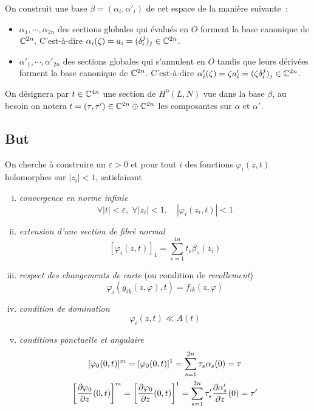 \documentclass[a4paper,10pt,draft,makeidx,twocolumn]{amsart}
\begin{document}
On construit une base $\beta = (\alpha_i, \alpha'_i)$ de cet espace de la manière suivante~:
\begin{itemize}
\item $\alpha_1, \cdots, \alpha_{2n}$ des sections globales qui évalués en $O$ forment la base canonique de $\mathbb{C}^{2n}$.
C'est-à-dire $\alpha_i(\zeta) = a_i = (\delta_i^j)_j \in \mathbb{C}^{2n}$. 
\item $\alpha'_1, \cdots, \alpha'_{2n}$ des sections globales qui s'annulent en $O$ tandis que leurs dérivées forment la base canonique de $\mathbb{C}^{2n}$.
C'est-à-dire $\alpha'_i(\zeta) = \zeta a'_i = (\zeta \delta_i^j)_j \in \mathbb{C}^{2n}$. 
\end{itemize}

On désignera par $t \in \mathbb{C}^{4n}$ une section de $H^0(L,N)$ vue dans la base $\beta$, au besoin on notera $t = (\tau, \tau') \in \mathbb{C}^{2n} \oplus \mathbb{C}^{2n}$ les composantes sur $\alpha$ et $\alpha'$.

\subsection{But}
On cherche à construire un $\varepsilon>0$ et pour tout $i$ des fonctions $\varphi_i(z,t)$ holomorphes sur $|z_i| < 1$, satisfaisant
\begin{enumerate}[(i)]
\item \emph{convergence en norme infinie}\label{CVinfty}
\[
\forall |t| < \varepsilon,\; \forall |z_i| < 1, \quad  | \varphi_i(z_i,t) | < 1
\]
\item \emph{extension d'une section de fibré normal}\label{Initialisation}
\[
[\varphi_i(z,t)]_1 = \sum_{s=1}^{4n} t_s \beta_s(z_i)
\]
\item \emph{respect des changements de carte} (ou condition de \emph{recollement})\label{Recollement}
\[
\varphi_i(g_{ik}(z,\varphi),t) = f_{ik}(z, \varphi)
\]
\item \emph{condition de domination}\label{Domination}
\[
\varphi_i(z,t) \ll A(t)
\]
\item \emph{conditions ponctuelle et angulaire}\label{Pt-Ang}
\begin{subequations}
\begin{gather}
	[\varphi_0(0,t)]^m = [\varphi_0(0,t)]^1  = \sum_{s=1}^{2n} \tau_s \alpha_s(0) = \tau\label{E:Pt}\\
	\left[\dfrac{\partial{\varphi_0}}{\partial{z}}(0,t)\right]^m = \left[\dfrac{\partial{\varphi_0}}{\partial{z}}(0,t)\right]^1  = \sum_{s=1}^{2n} \tau'_s \dfrac{\partial{\alpha'_s}}{\partial{z}}(0) = \tau' \label{E:Ang}
\end{gather}
\end{subequations}
\end{enumerate}
\end{document}
